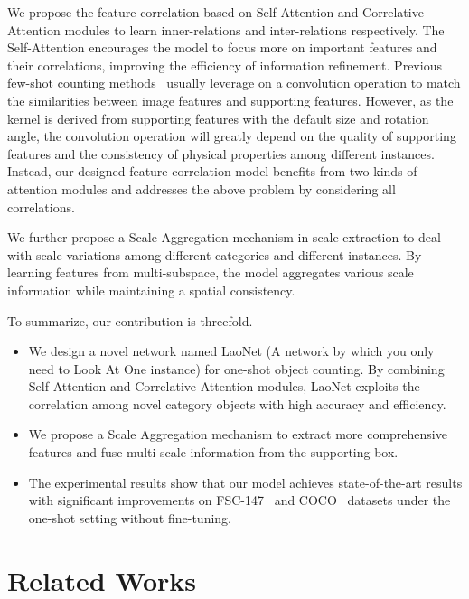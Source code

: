 \documentclass{article}
\begin{document}
We propose the feature correlation based on Self-Attention and Correlative-Attention modules to learn inner-relations and inter-relations respectively. The Self-Attention encourages the model to focus more on important features and their correlations, improving the efficiency of information refinement. Previous few-shot counting methods~\cite{ranjan2021learning, yang2021class} usually leverage on a convolution operation to match the similarities between image features and supporting features. However, as the kernel is derived from supporting features with the default size and rotation angle, the convolution operation will greatly depend on the quality of supporting features and the consistency of physical properties among different instances. Instead, our designed feature correlation model benefits from two kinds of attention modules and addresses the above problem by considering all correlations.

We further propose a Scale Aggregation mechanism in scale extraction to deal with scale variations among different categories and different instances. By learning features from multi-subspace, the model aggregates various scale information while maintaining a spatial consistency.

To summarize, our contribution is threefold. 

\begin{itemize}
    \item We design a novel network named LaoNet (A network by which you only need to Look At One instance) for one-shot object counting. By combining Self-Attention and Correlative-Attention modules,  LaoNet exploits the correlation among novel category objects with high accuracy and efficiency.
    
	\item We propose a Scale Aggregation mechanism to extract more comprehensive features and fuse multi-scale information from the supporting box.


	\item The experimental results show that our model achieves state-of-the-art results with significant improvements on FSC-147~\cite{ranjan2021learning} and COCO~\cite{lin2014microsoft} datasets under the one-shot setting without fine-tuning.
	


\end{itemize}



\section{Related Works}
\end{document}
